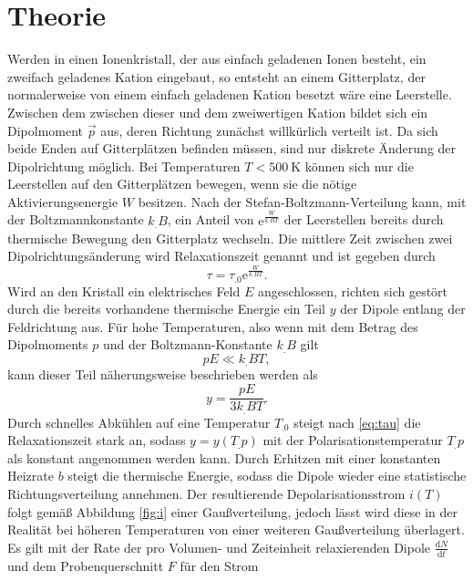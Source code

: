 \section{Theorie}
\label{sec:Theorie}

Werden in einen Ionenkristall, der aus einfach geladenen Ionen besteht, ein zweifach geladenes Kation eingebaut, so entsteht an einem Gitterplatz, der normalerweise von einem einfach geladenen Kation besetzt wäre eine Leerstelle.
Zwischen dem zwischen dieser und dem zweiwertigen Kation bildet sich ein Dipolmoment $\vec{p}$ aus, deren Richtung zunächst willkürlich verteilt ist. Da sich beide Enden auf Gitterplätzen befinden müssen, sind nur diskrete Änderung der Dipolrichtung möglich. Bei Temperaturen $T<\SI{500}{\kelvin}$ können sich nur die Leerstellen auf den Gitterplätzen bewegen, wenn sie die nötige Aktivierungsenergie $W$ besitzen. Nach der Stefan-Boltzmann-Verteilung kann, mit der Boltzmannkonstante $k_.B$, ein Anteil von $\mathrm{e}^{\frac{W}{k_.BT}}$ der Leerstellen bereits durch thermische Bewegung den Gitterplatz wechseln.
Die mittlere Zeit zwischen zwei Dipolrichtungsänderung wird Relaxationszeit genannt und ist gegeben durch
\begin{equation}
\tau=\tau_.0\mathrm{e}^{\frac{W}{k_.BT}}\text{.}\label{eq:tau}
\end{equation}
Wird an den Kristall ein elektrisches Feld $E$ angeschlossen, richten sich gestört durch die bereits vorhandene thermische Energie ein Teil $y$ der Dipole entlang der Feldrichtung aus. Für hohe Temperaturen, also wenn mit dem Betrag des Dipolmoments $p$ und der Boltzmann-Konstante $k_.B$ gilt
\[
pE\ll k_.BT,
\]
kann dieser Teil näherungsweise beschrieben werden als
\begin{equation}
y=\frac{pE}{3k_.BT}\text{.}\label{eq:y}
\end{equation}
Durch schnelles Abkühlen auf eine Temperatur $T_.0$ steigt nach \eqref{eq:tau} die Relaxationszeit stark an, sodass $y=y(T_.p)$ mit der Polarisationstemperatur $T_.p$ als konstant angenommen werden kann.
Durch Erhitzen mit einer konstanten Heizrate $b$ steigt die thermische Energie, sodass die Dipole wieder eine statistische Richtungsverteilung annehmen. Der resultierende Depolarisationsstrom $i(T)$ folgt gemäß Abbildung \ref{fig:i} einer Gaußverteilung, jedoch lässt wird diese in der Realität bei höheren Temperaturen von einer weiteren Gaußverteilung überlagert.
Es gilt mit der Rate der pro Volumen- und Zeiteinheit relaxierenden Dipole $\frac{\mathrm{d}N}{\mathrm{d}t}$ und dem Probenquerschnitt $F$ für den Strom
